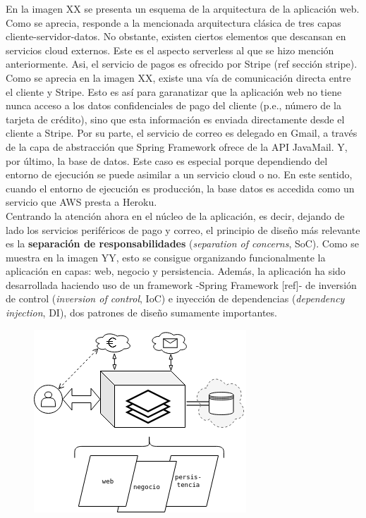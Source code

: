 \documentclass[a4paper]{report}
\begin{document}
    En la imagen XX se presenta un esquema de la arquitectura de la aplicación web. Como se aprecia, responde a la mencionada arquitectura clásica de tres capas cliente-servidor-datos. No obstante, existen ciertos elementos que descansan en servicios cloud externos. Este es el aspecto serverless al que se hizo mención anteriormente. Asi, el servicio de pagos es ofrecido por Stripe (ref sección stripe). Como se aprecia en la imagen XX, existe una vía de comunicación directa entre el cliente y Stripe. Esto es así para garanatizar que la aplicación web no tiene nunca acceso a los datos confidenciales de pago del cliente (p.e., número de la tarjeta de crédito), sino que esta información es enviada directamente desde el cliente a Stripe. Por su parte, el servicio de correo es delegado en Gmail, a través de la capa de abstracción que Spring Framework ofrece de la API JavaMail. Y, por último, la base de datos. Este caso es especial porque dependiendo del entorno de ejecución se puede asimilar a un servicio cloud o no. En este sentido, cuando el entorno de ejecución es producción, la base datos es accedida como un servicio que AWS presta a Heroku.
    \\
    
    Centrando la atención ahora en el núcleo de la aplicación, es decir, dejando de lado los servicios periféricos de pago y correo, el principio de diseño más relevante es la \textbf{separación de responsabilidades} (\emph{separation of concerns}, SoC). Como se muestra en la imagen YY, esto se consigue organizando funcionalmente la aplicación en capas: web, negocio y persistencia. Además, la aplicación ha sido desarrollada haciendo uso de un framework -Spring Framework [ref]- de inversión de control (\emph{inversion of control}, IoC) e inyección de dependencias (\emph{dependency injection}, DI), dos patrones de diseño sumamente importantes.
    
    \begin{figure}[h]
    	\centering
    	\includegraphics[width=\textwidth]{desing_layer_diagram}
    \end{figure}
    
\end{document}
